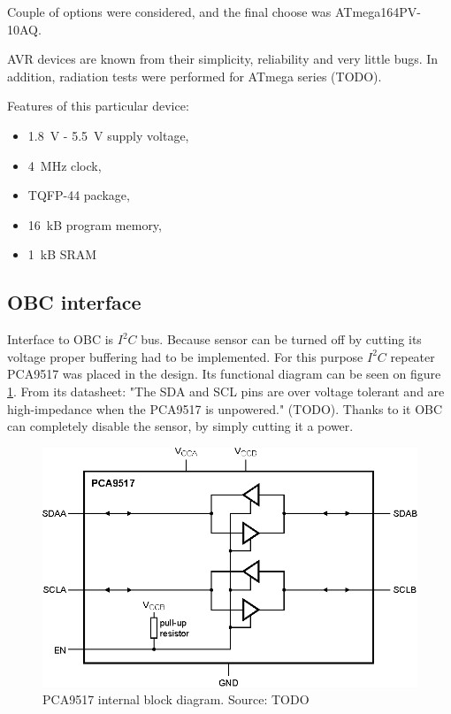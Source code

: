         Couple of options were considered, and the final choose was ATmega164PV-10AQ.

        AVR devices are known from their simplicity, reliability and very little bugs. In addition, radiation tests were performed for ATmega series (TODO).

        Features of this particular device:
        \begin{itemize}
            \item \SI{1.8}{\volt} - \SI{5.5}{\volt} supply voltage,
            \item \SI{4}{\mega\hertz} clock,
            \item TQFP-44 package,
            \item \SI{16}{\kilo B} program memory,
            \item \SI{1}{\kilo B} SRAM
        \end{itemize}

    \subsection{OBC interface}
        Interface to OBC is $I^2C$ bus. Because sensor can be turned off by cutting its voltage proper buffering had to be implemented. For this purpose $I^2C$ repeater PCA9517 was placed in the design. Its functional diagram can be seen on figure \ref{PCA9517}. From its datasheet: "The SDA and SCL pins are over voltage tolerant and are high-impedance when the PCA9517 is unpowered." (TODO). Thanks to it OBC can completely disable the sensor, by simply cutting it a power.

        \begin{figure}[H]
            \centering
            \includegraphics[width=0.7\paperwidth]{img/06/PCA9517.eps}
            \caption{PCA9517 internal block diagram. Source: TODO}
            \label{PCA9517}
        \end{figure}


